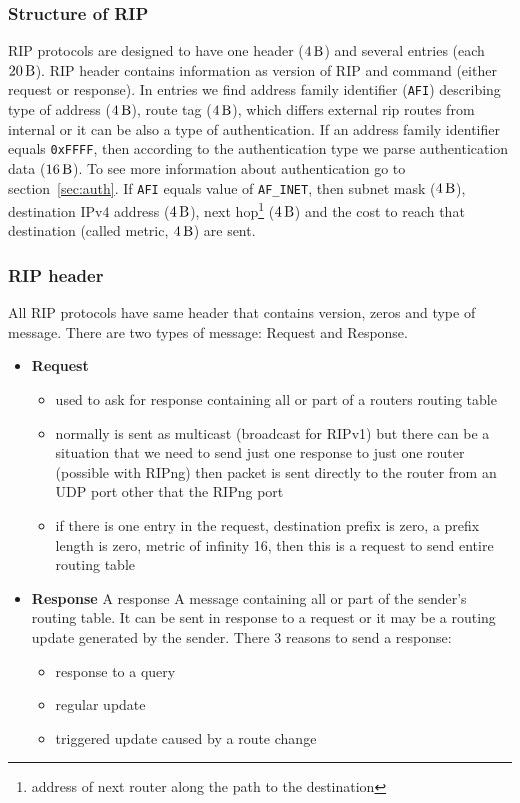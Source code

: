 \documentclass[11pt,a4paper]{article}
\begin{document}
\subsubsection{Structure of RIP}
\label{sec:ripv4}
RIP protocols are designed to have one header ($\SI{4}{\byte}$) and several entries (each $\SI{20}{\byte}$). RIP header contains information as version of RIP and command (either request or response). In entries we find address family identifier (\texttt{AFI}) describing type of address ($\SI{4}{\byte}$), route tag ($\SI{4}{\byte}$), which differs external rip routes from internal or it can be also a type of authentication. If an address family identifier equals \texttt{0xFFFF}, then according to the authentication type we parse authentication data ($\SI{16}{\byte}$). To see more information about authentication go to section~\ref{sec:auth}. If \texttt{AFI} equals value of \texttt{AF\_INET}, then subnet mask ($\SI{4}{\byte}$), destination IPv4 address ($\SI{4}{\byte}$), next hop\footnote{address of next router along the path to the destination} ($\SI{4}{\byte}$) and the cost to reach that destination (called metric, $\SI{4}{\byte}$) are sent.

\subsubsection{RIP header}
All RIP protocols have same header that contains version, zeros and type of message. There are two types of message: Request and Response.

\begin{itemize}
\item \textbf{Request}
\begin{itemize}
\item used to ask for response containing all or part of a routers routing table  
\item normally is sent as multicast (broadcast for RIPv1) but there can be a situation that we need to send just one response to just one router (possible with RIPng) then packet is sent directly to the router from an UDP port other that the RIPng port
\item if there is one entry in the request, destination prefix is zero, a prefix length is zero, metric of infinity 16, then this is a request to send entire routing table
\end{itemize}

\item \textbf{Response}
A response A message containing all or part of the sender's routing table.  It can be sent in response to a request or it may be a routing update generated by the sender.
There 3 reasons to send a response:
\begin{itemize}
\item response to a query
\item regular update
\item triggered update caused by a route change
\end{itemize}
\end{itemize}
\end{document}
